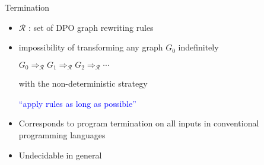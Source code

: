 \documentclass{beamer}
\begin{document}
\begin{frame}{Termination}
  \begin{itemize}
    \item $\mathcal{R}$ : set of DPO graph rewriting rules
    \item impossibility of transforming any graph $G_0$ indefinitely
      \begin{center}
        $G_0 \Rightarrow_\mathcal{R} G_1 \Rightarrow_\mathcal{R} G_2 \Rightarrow_\mathcal{R} \cdots$
      \end{center}
      with the non-deterministic strategy
          \begin{center}
              \textcolor{blue}{\enquote{apply rules as long as possible}}
          \end{center}
    \item Corresponds to program termination on all inputs in conventional programming languages
          
    \item Undecidable in general~\cite{plump1998terminationundecidable}

  \end{itemize}
\end{frame}

\end{document}
